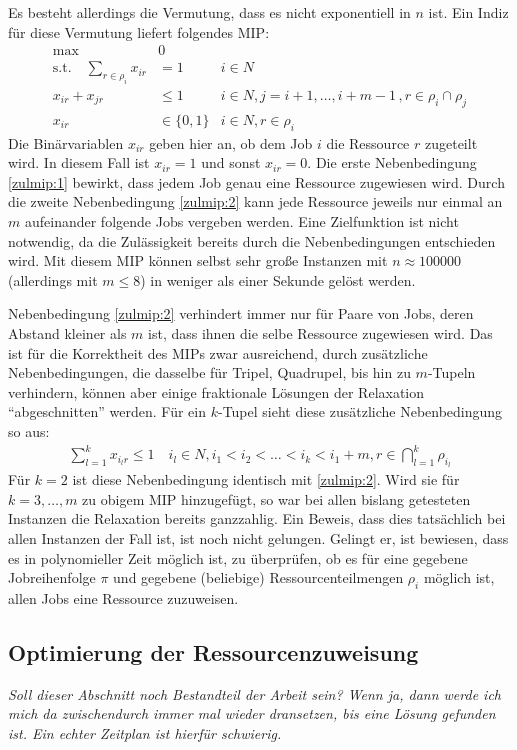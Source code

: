\documentclass{scrreprt}
\begin{document}
Es besteht allerdings die Vermutung, dass es nicht exponentiell in $n$ ist. Ein Indiz für diese Vermutung liefert folgendes MIP:
\begin{align}
    \text{max} \quad &0 \label{zulmip:obj} \\
    \text{s.t.}\quad \sum_{r\in\rho_i} x_{ir} &= 1 & i\in N \label{zulmip:1} \\
    x_{ir} + x_{jr} &\leq 1 & i\in N, j=i+1,\ldots,i+m-1 \, ,r\in\rho_i\cap\rho_j \label{zulmip:2} \\
    x_{ir} &\in \{0,1\} & i\in N, r\in\rho_i
\end{align}
Die Binärvariablen $x_{ir}$ geben hier an, ob dem Job $i$ die Ressource $r$ zugeteilt wird.
In diesem Fall ist $x_{ir}=1$ und sonst $x_{ir}=0$.
Die erste Nebenbedingung \ref{zulmip:1} bewirkt, dass jedem Job genau eine Ressource zugewiesen wird.
Durch die zweite Nebenbedingung \ref{zulmip:2} kann jede Ressource jeweils nur einmal an $m$ aufeinander folgende Jobs vergeben werden.
Eine Zielfunktion ist nicht notwendig, da die Zulässigkeit bereits durch die Nebenbedingungen entschieden wird.
Mit diesem MIP können selbst sehr große Instanzen mit $n\approx 100000$ (allerdings mit $m\leq 8$) in weniger als einer Sekunde gelöst werden.

Nebenbedingung \ref{zulmip:2} verhindert immer nur für Paare von Jobs, deren Abstand kleiner als $m$ ist, dass ihnen die selbe Ressource zugewiesen wird.
Das ist für die Korrektheit des MIPs zwar ausreichend, durch zusätzliche Nebenbedingungen, die dasselbe für Tripel, Quadrupel, bis hin zu $m$-Tupeln verhindern,
können aber einige fraktionale Lösungen der Relaxation "`abgeschnitten"' werden.
Für ein $k$-Tupel sieht diese zusätzliche Nebenbedingung so aus:
\begin{align}
    \sum_{l=1}^k x_{i_lr} \leq 1 \quad i_l\in N, i_1<i_2<\ldots<i_k<i_1+m, r\in\bigcap_{l=1}^k \rho_{i_l}
\end{align}
Für $k=2$ ist diese Nebenbedingung identisch mit \ref{zulmip:2}.
Wird sie für $k=3,\ldots,m$ zu obigem MIP hinzugefügt, so war bei allen bislang getesteten Instanzen die Relaxation bereits ganzzahlig.
Ein Beweis, dass dies tatsächlich bei allen Instanzen der Fall ist, ist noch nicht gelungen.
Gelingt er, ist bewiesen, dass es in polynomieller Zeit möglich ist, zu überprüfen, ob es für eine gegebene Jobreihenfolge $\pi$ und 
gegebene (beliebige) Ressourcenteilmengen $\rho_i$ möglich ist, allen Jobs eine Ressource zuzuweisen.


\subsection{Optimierung der Ressourcenzuweisung}
\label{subsec:OptimierungDerRessourcenzuweisung}
\textit{Soll dieser Abschnitt noch Bestandteil der Arbeit sein? Wenn ja, dann werde ich mich da zwischendurch immer mal wieder dransetzen,
bis eine Lösung gefunden ist. Ein echter Zeitplan ist hierfür schwierig.}
\end{document}

